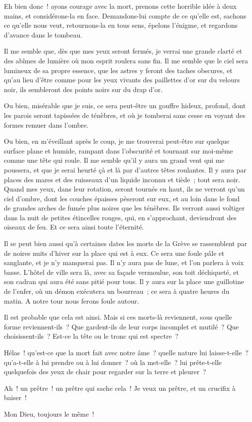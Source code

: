 \documentclass[french,twoside]{book} %
\begin{document}
\noindent Eh bien donc ! ayons courage avec la mort, prenons cette horrible idée à deux mains, et considérons-la en face. Demandons-lui compte de ce qu’elle est, sachons ce qu’elle nous veut, retournons-la en tous sens, épelons l’énigme, et regardons d’avance dans le tombeau.\par
Il me semble que, dès que mes yeux seront fermés, je verrai une grande clarté et des abîmes de lumière où mon esprit roulera sans fin. Il me semble que le ciel sera lumineux de sa propre essence, que les astres y feront des taches obscures, et qu’au lieu d’être comme pour les yeux vivants des paillettes d’or sur du velours noir, ils sembleront des points noirs sur du drap d’or.\par
Ou bien, misérable que je suis, ce sera peut-être un gouffre hideux, profond, dont les parois seront tapissées de ténèbres, et où je tomberai sans cesse en voyant des formes remuer dans l’ombre.\par
Ou bien, en m’éveillant après le coup, je me  trouverai peut-être sur quelque surface plane et humide, rampant dans l’obscurité et tournant sur moi-même comme une tête qui roule. Il me semble qu’il y aura un grand vent qui me poussera, et que je serai heurté çà et là par d’autres têtes roulantes. Il y aura par places des mares et des ruisseaux d’un liquide inconnu et tiède ; tout sera noir. Quand mes yeux, dans leur rotation, seront tournés en haut, ils ne verront qu’un ciel d’ombre, dont les couches épaisses pèseront sur eux, et au loin dans le fond de grandes arches de fumée plus noires que les ténèbres. Ils verront aussi voltiger dans la nuit de petites étincelles rouges, qui, en s’approchant, deviendront des oiseaux de feu. Et ce sera ainsi toute l’éternité.\par
Il se peut bien aussi qu’à certaines dates les morts de la Grève se rassemblent par de noires nuits d’hiver sur la place qui est à eux. Ce sera une foule pâle et sanglante, et je n’y manquerai pas. Il n’y aura pas de lune, et l’on parlera à voix basse. L’hôtel de ville sera là, avec sa façade vermoulue, son toit déchiqueté, et son cadran qui aura été sans pitié pour tous. Il y aura sur la place une guillotine de l’enfer, où un démon exécutera un bourreau ; ce sera à quatre heures du matin. A notre tour nous ferons foule autour.\par
Il est probable que cela est ainsi. Mais si ces morts-là reviennent, sous quelle forme reviennent-ils ? Que gardent-ils de leur corps incomplet et mutilé ? Que choisissent-ils ? Est-ce la tête ou le tronc qui est spectre ?\par
Hélas ! qu’est-ce que la mort fait avec notre âme ?  quelle nature lui laisse-t-elle ? qu’a-t-elle à lui prendre ou à lui donner ? où la met-elle ? lui prête-t-elle quelquefois des yeux de chair pour regarder sur la terre et pleurer ?\par
Ah ! un prêtre ! un prêtre qui sache cela ! Je veux un prêtre, et un crucifix à baiser !\par
Mon Dieu, toujours le même !
\end{document}
